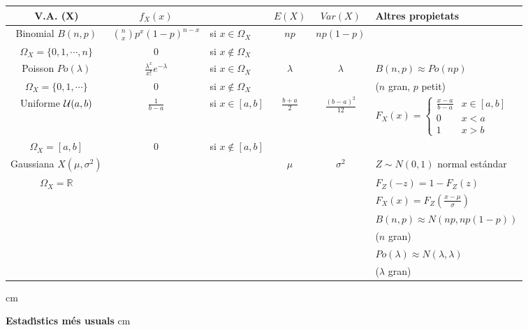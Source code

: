 \documentclass[a4paper,12pt]{article}
\begin{document}
{\begin{tabular}{|c|cl|c|c|l|}
V.A. (X) & $f_X(x)$ & & $E(X)$ & $Var(X)$ & Altres propietats \\
\hline
Binomial $B(n, p)$ & $\binom{n}{x} p^x (1-p)^{n-x}$ & si $x\in \Omega_X$ &
 $np$ & $np(1-p)$ & \\
$\Omega_X=\{ 0, 1, \cdots, n \}$ & $0$ & si $x \notin \Omega_X$ & & & \\ \hline
Poisson $Po(\lambda)$ & $\frac{\lambda^x}{x!} e^{-\lambda}$ & si $x\in \Omega_X$ & 
 $\lambda$ & $\lambda$ & $B(n, p) \approx Po(np)$ \\
$\Omega_X=\{ 0, 1, \cdots \}$ & $0$ & si $x \notin \Omega_X$ & & & ($n$ gran, $p$ petit)\\ \hline
Uniforme ${\cal U}(a, b)$ & $\frac{1}{b-a}$ & si $x \in [a, b]$ & 
$\frac{b+a}{2}$ & $\frac{(b-a)^2}{12}$ & 
$F_X(x)=\begin{cases} 
\frac{x-a}{b-a} & x \in [a, b] \\
0 & x < a \\
1 & x > b
\end{cases}$ \\
$\Omega_X=[a, b]$ & 0 & si $x \notin [a, b]$ &  & & \\ \hline
Gaussiana $X(\mu, \sigma^2)$ & & & $\mu$ & $\sigma^2$ & $Z\sim N(0, 1)$ normal est\'andar \\
$\Omega_X=\mathbb{R}$ & & & &  & $F_Z(-z)=1-F_Z(z)$ \\
 & & & &  & $F_X(x)=F_Z(\frac{x-\mu}{\sigma})$ \\ 
 & & & &  & $B(n, p) \approx N(np, np(1-p))$ \\ 
 & & & &  & ($n$ gran) \\
 & & & &  & $Po(\lambda) \approx N(\lambda, \lambda)$ \\ 
 & & & &  & ($\lambda$ gran) \\ \hline
\end{tabular}

 cm

\textbf{Estad\'\i stics m\'es usuals}
 cm

}
\end{document}

